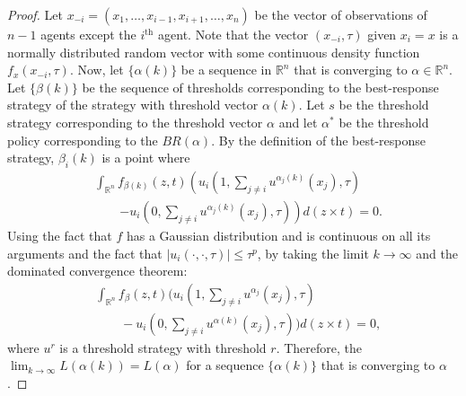 \documentclass{nature}
\def\R{\mathbb{R}}    %
\begin{document}
\begin{proof}
Let $x_{-i}=(x_1,\ldots,x_{i-1},x_{i+1},\ldots,x_n)$ be the vector of observations of $n-1$ agents except the $i^{\text{th}}$ agent. Note that the vector $(x_{-i},\tau)$ given $x_i=x$ is a normally distributed random vector with some continuous density function $f_{x}(x_{-i},\tau)$. Now, let $\{\alpha(k)\}$ be a sequence in $\R^n$ that is converging to $\alpha\in\R^n$. Let $\{\beta(k)\}$ be the sequence of thresholds corresponding to the best-response strategy of the strategy with threshold vector $\alpha(k)$. Let $s$ be the threshold strategy corresponding to the threshold vector $\alpha$ and let $\alpha^*$ be the threshold policy corresponding to the $BR(\alpha)$. By the definition of the best-response strategy, $\beta_i(k)$ is a point where 
\begin{align*}
&\int_{\R^{n}}f_{\beta(k)}(z,t)\left(u_i(1,\sum_{j\not=i}u^{\alpha_j(k)}(x_j),\tau)\right.\\
&\qquad\left.-u_i(0,\sum_{j\not=i}u^{\alpha_j(k)}(x_j),\tau)\right)d(z\times t)=0.
\end{align*}
Using the fact that $f$ has a Gaussian distribution and is continuous on all its arguments and the fact that $|u_i(\cdot,\cdot,\tau)|\leq \tau^p$, by taking the limit $k\to\infty$ and the dominated convergence theorem:
\begin{align*}
&\int_{\R^{n}}f_{\beta}(z,t)(u_i(1,\sum_{j\not=i}u^{\alpha_j}(x_j),\tau)\\ 
&\qquad-u_i(0,\sum_{j\not=i}u^{\alpha(k)}(x_j),\tau))d(z\times t)=0,
\end{align*}
where $u^{r}$ is a threshold strategy with threshold $r$. Therefore, the $\lim_{k\to\infty}L(\alpha(k))=L(\alpha)$ for a sequence $\{\alpha(k)\}$ that is converging to $\alpha$.
\end{proof}
\end{document}

